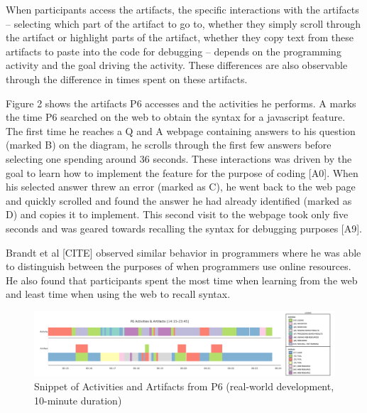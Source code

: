 
When participants access the artifacts, the specific interactions with the artifacts -- selecting which part of the artifact to go to, whether they simply scroll through the artifact or highlight parts of the artifact, whether they copy text from these artifacts to paste into the code for debugging -- depends on the programming activity and the goal driving the activity. These differences are also observable through the difference in times spent on these artifacts.

Figure 2 shows the artifacts P6 accesses and the activities he performs. A marks the time P6 searched on the web to obtain the syntax for a javascript feature. The first time he reaches a Q and A webpage containing answers to his question (marked B) on the diagram, he scrolls through the first few answers before selecting one spending around 36 seconds. These interactions was driven by the goal to learn how to implement the feature for the purpose of coding [A0]. When his selected answer threw an error (marked as C), he went back to the web page and quickly scrolled and found the answer he had already identified (marked as D) and copies it to implement. This second visit to the webpage took only five seconds and was geared towards recalling the syntax for debugging purposes [A9]. 

Brandt et al [CITE] observed similar behavior in programmers where he was able to distinguish between the purposes of when programmers use online resources. He also found that participants spent the most time when learning from the web and least time when using the web to recall syntax.

\begin{figure}
\includegraphics[width=\textwidth]{figures/P6timeplot}
\caption{Snippet of Activities and Artifacts from P6 (real-world development, 10-minute duration)}
\end{figure}



